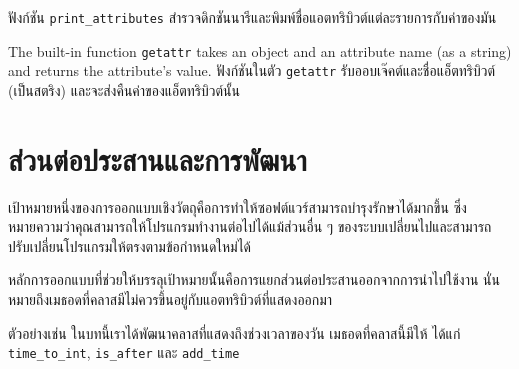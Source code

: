 ฟังก์ชัน \verb"print_attributes" สำรวจดิกชันนารีและพิมพ์ชื่อแอตทริบิวต์แต่ละรายการกับค่าของมัน


The built-in function {\tt getattr} takes an object and an attribute
name (as a string) and returns the attribute's value.
ฟังก์ชันในตัว {\tt getattr} รับออบเจ๊คต์และชื่อแอ็ตทริบิวต์ (เป็นสตริง) และจะส่งคืนค่าของแอ็ตทริบิวต์นั้น


\section{ส่วนต่อประสานและการพัฒนา} %


เป้าหมายหนึ่งของการออกแบบเชิงวัตถุคือการทำให้ซอฟต์แวร์สามารถบำรุงรักษาได้มากขึ้น 
ซึ่งหมายความว่าคุณสามารถให้โปรแกรมทำงานต่อไปได้แม้ส่วนอื่น ๆ ของระบบเปลี่ยนไปและสามารถปรับเปลี่ยนโปรแกรมให้ตรงตามข้อกำหนดใหม่ได้


หลักการออกแบบที่ช่วยให้บรรลุเป้าหมายนั้นคือการแยกส่วนต่อประสานออกจากการนำไปใช้งาน นั่นหมายถึงเมธอดที่คลาสมีไม่ควรขึ้นอยู่กับแอตทริบิวต์ที่แสดงออกมา


ตัวอย่างเช่น ในบทนี้เราได้พัฒนาคลาสที่แสดงถึงช่วงเวลาของวัน เมธอดที่คลาสนี้มีให้ 
ได้แก่ \verb"time_to_int", \verb"is_after" และ \verb"add_time" 


